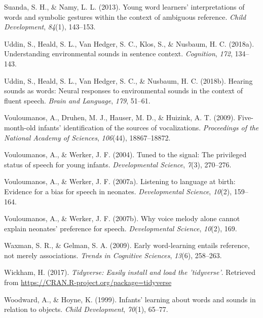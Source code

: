 \documentclass[english,floatsintext,man]{apa6}
\theoremstyle{definition}
\theoremstyle{definition}
\theoremstyle{definition}
\theoremstyle{remark}
\begin{document}
\leavevmode\hypertarget{ref-suanda2013young}{}%
Suanda, S. H., \& Namy, L. L. (2013). Young word learners'
interpretations of words and symbolic gestures within the context of
ambiguous reference. \emph{Child Development}, \emph{84}(1), 143--153.

\leavevmode\hypertarget{ref-uddin2018understanding}{}%
Uddin, S., Heald, S. L., Van Hedger, S. C., Klos, S., \& Nusbaum, H. C.
(2018a). Understanding environmental sounds in sentence context.
\emph{Cognition}, \emph{172}, 134--143.

\leavevmode\hypertarget{ref-uddin2018hearing}{}%
Uddin, S., Heald, S. L., Van Hedger, S. C., \& Nusbaum, H. C. (2018b).
Hearing sounds as words: Neural responses to environmental sounds in the
context of fluent speech. \emph{Brain and Language}, \emph{179}, 51--61.

\leavevmode\hypertarget{ref-vouloumanos2009five}{}%
Vouloumanos, A., Druhen, M. J., Hauser, M. D., \& Huizink, A. T. (2009).
Five-month-old infants' identification of the sources of vocalizations.
\emph{Proceedings of the National Academy of Sciences}, \emph{106}(44),
18867--18872.

\leavevmode\hypertarget{ref-vouloumanos2004tuned}{}%
Vouloumanos, A., \& Werker, J. F. (2004). Tuned to the signal: The
privileged status of speech for young infants. \emph{Developmental
Science}, \emph{7}(3), 270--276.

\leavevmode\hypertarget{ref-vouloumanos2007listening}{}%
Vouloumanos, A., \& Werker, J. F. (2007a). Listening to language at
birth: Evidence for a bias for speech in neonates. \emph{Developmental
Science}, \emph{10}(2), 159--164.

\leavevmode\hypertarget{ref-vouloumanos2007voice}{}%
Vouloumanos, A., \& Werker, J. F. (2007b). Why voice melody alone cannot
explain neonates' preference for speech. \emph{Developmental Science},
\emph{10}(2), 169.

\leavevmode\hypertarget{ref-waxman2009early}{}%
Waxman, S. R., \& Gelman, S. A. (2009). Early word-learning entails
reference, not merely associations. \emph{Trends in Cognitive Sciences},
\emph{13}(6), 258--263.

\leavevmode\hypertarget{ref-R-tidyverse}{}%
Wickham, H. (2017). \emph{Tidyverse: Easily install and load the
'tidyverse'}. Retrieved from
\url{https://CRAN.R-project.org/package=tidyverse}

\leavevmode\hypertarget{ref-woodward1999infants}{}%
Woodward, A., \& Hoyne, K. (1999). Infants' learning about words and
sounds in relation to objects. \emph{Child Development}, \emph{70}(1),
65--77.
\end{document}
